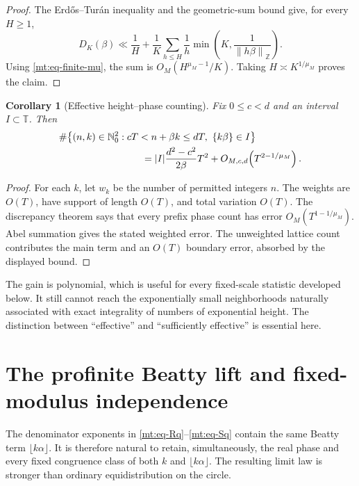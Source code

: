 \documentclass[11pt,oneside]{article}
\newtheorem{corollary}[theorem]{Corollary}
\theoremstyle{definition}
\theoremstyle{remark}
\newcommand{\Nzero}{\mathbb N_0}
\newcommand{\Z}{\mathbb Z}
\newcommand{\Torus}{\mathbb T}
\newcommand{\fract}[1]{\left\{#1\right\}}
\newcommand{\distZ}[1]{\left\lVert #1\right\rVert_{\Z}}
\begin{document}
\begin{proof}
The Erd\H{o}s--Tur\'an inequality and the geometric-sum bound give, for every $H\ge1$,
\[
 D_K(\beta)
 \ll \frac1H+\frac1K\sum_{h\le H}
       \frac1h\min\!\left(K,\frac1{\distZ{h\beta}}\right).
\]
Using \eqref{mt:eq-finite-mu}, the sum is
$O_M(H^{\mu_M-1}/K)$.  Taking $H\asymp K^{1/\mu_M}$ proves the claim.
\end{proof}

\begin{corollary}[Effective height--phase counting]
\label{mt:cor-weighted-count}
Fix $0\le c<d$ and an interval $I\subset\Torus$.  Then
\begin{align}
 &\#\bigl\{(n,k)\in\Nzero^2:
      cT<n+\beta k\le dT,
      \ \fract{k\beta}\in I\bigr\}
 \notag\\
 &\hspace{3cm}=
 |I|\frac{d^2-c^2}{2\beta}T^2
 +O_{M,c,d}\!\left(T^{2-1/\mu_M}\right).
 \label{mt:eq-weighted-count}
\end{align}
\end{corollary}

\begin{proof}
For each $k$, let $w_k$ be the number of permitted integers $n$.  The weights are $O(T)$,
have support of length $O(T)$, and total variation $O(T)$.  The discrepancy theorem says that
every prefix phase count has error $O_M(T^{1-1/\mu_M})$.  Abel summation gives the stated
weighted error.  The unweighted lattice count contributes the main term and an $O(T)$ boundary
error, absorbed by the displayed bound.
\end{proof}

The gain is polynomial, which is useful for every fixed-scale statistic developed below.  It
still cannot reach the exponentially small neighborhoods naturally associated with exact
integrality of numbers of exponential height.  The distinction between ``effective'' and
``sufficiently effective'' is essential here.

\section{The profinite Beatty lift and fixed-modulus independence}
\label{mt:sec-profinite}

The denominator exponents in \eqref{mt:eq-Rq}--\eqref{mt:eq-Sq} contain the same Beatty term
$\lfloor k\alpha\rfloor$.  It is therefore natural to retain, simultaneously, the real phase
and every fixed congruence class of both $k$ and $\lfloor k\alpha\rfloor$.  The resulting
limit law is stronger than ordinary equidistribution on the circle.
\end{document}

